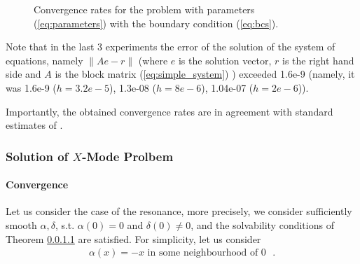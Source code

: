 \begin{figure}
    \caption{Convergence rates for the problem with parameters (\ref{eq:parameters}) with the boundary condition (\ref{eq:bcs}).}
    \label{fig:conv_rate}
\end{figure}

Note that in the last 3 experiments the error of the solution of the system of equations, namely $\|Ae-r\|$ (where $e$ is the solution vector, $r$ is the right hand side and $A$ is the block matrix (\ref{eq:simple_system}) ) exceeded 1.6e-9
(namely, it was 1.6e-9 ($h=3.2e-5$), 1.3e-08 ($h=8e-6$), 1.04e-07 ($h=2e-6$)).

Importantly, the obtained convergence rates are in agreement with standard estimates of \cite{brenner}.



\subsubsection{Solution of $X$-Mode Prolbem}
\paragraph{Convergence}
Let us consider the case of the resonance, more precisely, we consider sufficiently smooth
$\alpha,\delta$, s.t. $\alpha(0)=0$ and $\delta(0)\neq 0$, and the solvability conditions 
of Theorem \ref{}  are satisfied. 
For simplicity, let us consider 
\begin{align}
\label{eq:cond}
 \alpha(x)=-x \text{  in some neighbourhood of $0$ }.
\end{align}


